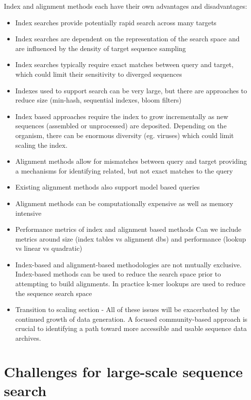 Index and alignment methods each have their own advantages and disadvantages:
\begin{itemize}
    \item Index searches provide potentially rapid search across many targets
    \item Index searches are dependent on the representation of the search space and are influenced by the density of target sequence sampling 
    \item Index searches typically require exact matches between query and target, which could limit their sensitivity to diverged sequences
    \item Indexes used to support search can be very large, but there are approaches to reduce size (min-hash, sequential indexes, bloom filters)
    \item Index based approaches require the index to grow incrementally as new sequences (assembled or unprocessed) are deposited. Depending on the organism, there can be enormous diversity (eg. viruses) which could limit scaling the index.
    \item Alignment methods allow for mismatches between query and target providing a mechanisms for identifying related, but not exact matches to the query
    \item Existing alignment methods also support model based queries
    \item Alignment methods can be computationally expensive as well as memory intensive
    \item Performance metrics of index and alignment based methods
Can we include metrics around size (index tables vs alignment dbs) and performance (lookup vs linear vs quadratic)
    \item Index-based and alignment-based methodologies are not mutually exclusive. Index-based methods can be used to reduce the search space prior to attempting to build alignments. In practice k-mer lookups are used to reduce the sequence search space 
    \item Transition to scaling section - All of these issues will be exacerbated by the continued growth of data generation. A focused community-based approach is crucial to identifying a path toward more accessible and usable sequence data archives. 

\end{itemize}

\section{Challenges for large-scale sequence search}
\label{sec:SeqSearchChallenges}


